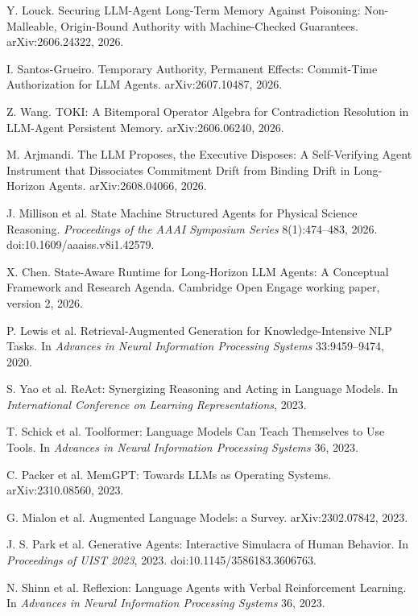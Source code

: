  Y. Louck. Securing LLM-Agent Long-Term Memory Against Poisoning: Non-Malleable, Origin-Bound Authority with Machine-Checked Guarantees. arXiv:2606.24322, 2026.

 I. Santos-Grueiro. Temporary Authority, Permanent Effects: Commit-Time Authorization for LLM Agents. arXiv:2607.10487, 2026.

 Z. Wang. TOKI: A Bitemporal Operator Algebra for Contradiction Resolution in LLM-Agent Persistent Memory. arXiv:2606.06240, 2026.

 M. Arjmandi. The LLM Proposes, the Executive Disposes: A Self-Verifying Agent Instrument that Dissociates Commitment Drift from Binding Drift in Long-Horizon Agents. arXiv:2608.04066, 2026.

 J. Millison et al. State Machine Structured Agents for Physical Science Reasoning. \emph{Proceedings of the AAAI Symposium Series} 8(1):474--483, 2026. doi:10.1609/aaaiss.v8i1.42579.

 X. Chen. State-Aware Runtime for Long-Horizon LLM Agents: A Conceptual Framework and Research Agenda. Cambridge Open Engage working paper, version 2, 2026.

 P. Lewis et al. Retrieval-Augmented Generation for Knowledge-Intensive NLP Tasks. In \emph{Advances in Neural Information Processing Systems} 33:9459--9474, 2020.

 S. Yao et al. ReAct: Synergizing Reasoning and Acting in Language Models. In \emph{International Conference on Learning Representations}, 2023.

 T. Schick et al. Toolformer: Language Models Can Teach Themselves to Use Tools. In \emph{Advances in Neural Information Processing Systems} 36, 2023.

 C. Packer et al. MemGPT: Towards LLMs as Operating Systems. arXiv:2310.08560, 2023.

 G. Mialon et al. Augmented Language Models: a Survey. arXiv:2302.07842, 2023.

 J. S. Park et al. Generative Agents: Interactive Simulacra of Human Behavior. In \emph{Proceedings of UIST 2023}, 2023. doi:10.1145/3586183.3606763.

 N. Shinn et al. Reflexion: Language Agents with Verbal Reinforcement Learning. In \emph{Advances in Neural Information Processing Systems} 36, 2023.

